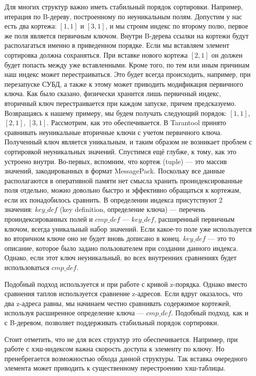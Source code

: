 Для многих структур важно иметь стабильный порядок сортировки.
Например, итерация по B-дереву, построенному по неуникальным полям.
Допустим у нас есть два кортежа: $[1, 1]$ и $[3, 1]$,
и мы строим индекс по второму полю,
первое же поля является первичным ключом.
Внутри B-дерева ссылки на кортежи будут располагаться именно в приведенном порядке.
Если мы вставляем элемент сортировка должна сохраняться.
При вставке нового кортежа $[2, 1]$ он должен будет попасть между уже вставленными.
Кроме того, по тем или иным причинам наш индекс может перестраиваться.
Это будет всегда происходить, например, при перезапуске СУБД,
а также к этому может приводить модификация первичного ключа.
Как было сказано, физически хранится лишь первичный индекс,
вторичный ключ перестраивается при каждом запуске,
причем предсказуемо.
Возвращаясь к нашему примеру, мы будем получать следующий порядок:
$[1, 1]$, $[2, 1]$, $[3, 1]$.
Рассмотрим, как это обеспечивается.
В Tarantool принято сравнивать неуникальные вторичные ключи с учетом первичного ключа.
Полученный ключ является уникальным, и таким образом не возникает проблем с сортировкой неуникальных значений.
Спустимся ещё глубже, к тому, как это устроено внутри.
Во-первых, вспомним, что кортеж (tuple) --- это массив значений, закодированных в формат MessagePack.
Поскольку все данные располагаются в оперативной памяти
нет смысла хранить проиндексированные поля отдельно,
можно довольно быстро и эффективно обращаться к кортежам,
если их понадобилось сравнить.
В определении индекса присутствуют 2 значения: $key\_def$ (key definition, определение ключа) --- 
перечень проиндексированных полей и $cmp\_def$ --- $key\_def$, расширенный первичным ключом, всегда уникальный набор значений.
Если какое-то поле уже используется во вторичном ключе оно не будет вновь дописано в конец.
$key\_def$ --- это то описание, которое было задано пользователем при создании данного индекса.
Однако, если этот ключ неуникальный, во всех внутренних сравнениях будет использоваться $cmp\_def$.

Подобный подход используется и при работе с кривой z-порядка.
Однако вместо сравнения таплов используется сравнение z-адресов.
Если вдруг оказалось, что два z-адреса равны, мы начинаем честно сравнивать
содержимое кортежей, используя расширенное определение ключа --- $cmp\_def$.
Подобный подход, как и с B-деревом, позволяет поддерживать
стабильный порядок сортировки.

Стоит отметить, что не для всех структур это обеспечивается.
Например, при работе с хэш-индексом важна скорость доступа к элементу по ключу.
Но пренебрегается возможностью обхода данной структуры.
Так вставка очередного элемента может приводить к существенному
перестроению хэш-таблицы.


